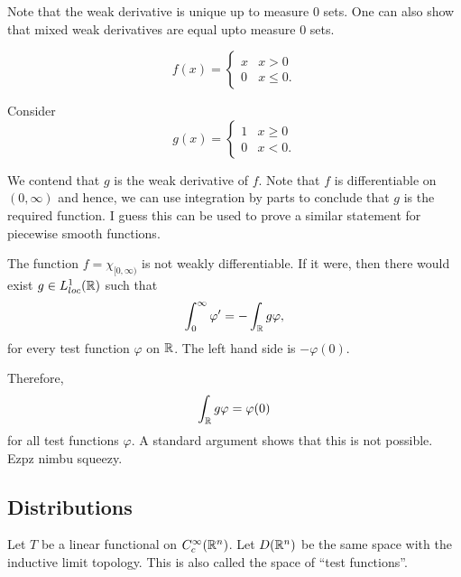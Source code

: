 Note that the weak derivative is unique up to measure $0$ sets. One can also show that mixed weak derivatives are equal upto measure $0$ sets. 

\begin{example}
    \begin{equation*}
        f(x) = 
        \begin{cases}
            x & x > 0\\
            0 & x\le 0.
        \end{cases}
    \end{equation*}

    Consider 
    \begin{equation*}
        g(x) = \begin{cases}
            1 & x\ge 0\\
            0 & x < 0.
        \end{cases}
    \end{equation*}

    We contend that $g$ is the weak derivative of $f$. Note that $f$ is differentiable on $(0,\infty)$ and hence, we can use integration by parts to conclude that $g$ is the required function. I guess this can be used to prove a similar statement for piecewise smooth functions.
\end{example}

\begin{example}
    The function $f = \chi_{[0,\infty)}$ is not weakly differentiable. If it were, then there would exist $g\in L^1_{loc}(\mathbb{R})$ such that 
    \begin{equation*}
        \int_{0}^\infty\varphi' = -\int_{\mathbb{R}} g\varphi,
    \end{equation*}
    for every test function $\varphi$ on $\mathbb{R}$. The left hand side is $-\varphi(0)$.

    Therefore, 
    \begin{equation*}
        \int_{\mathbb{R}}g\varphi = \varphi(0)
    \end{equation*}
    for all test functions $\varphi$. A standard argument shows that this is not possible. Ezpz nimbu squeezy.
\end{example}

\subsection*{Distributions}

Let $T$ be a linear functional on $C_c^{\infty}(\mathbb{R}^n)$. Let $D(\mathbb{R}^n)$ be the same space with the inductive limit topology. This is also called the space of ``test functions''.

